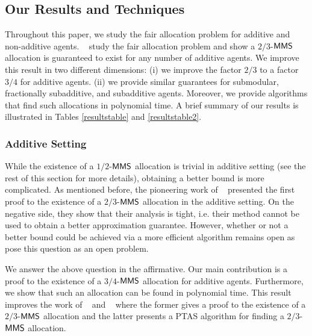 \subsection{Our Results and Techniques}\label{results}
Throughout this paper, we study the fair allocation problem for additive and non-additive agents.
\procacciafirst~\cite{Procaccia:first} study the fair allocation problem and show a $2/3$-$\mathsf{MMS}$ allocation is guaranteed to exist for any number of additive agents. We improve this result in two different dimensions: (i) we improve the factor $2/3$ to a factor $3/4$ for additive agents. (ii) we provide similar guarantees for submodular, fractionally subadditive, and subadditive agents. Moreover, we provide algorithms that find such allocations in polynomial time. A brief summary of our results is illustrated in Tables \ref{resultstable} and \ref{resultstable2}.



\subsubsection{Additive Setting}

While the existence of a $1/2$-$\mathsf{MMS}$ allocation is trivial in additive setting (see the rest of this section for more details), obtaining a better bound is more complicated. As mentioned before, the pioneering work of \procacciafirst ~\cite{Procaccia:first} presented the first proof to the existence of a $2/3$-$\mathsf{MMS}$ allocation in the additive setting. 
On the negative side, they show that their analysis is tight, i.e. %
their method cannot be used to obtain a better approximation guarantee. However, whether or not a better bound could be achieved via a more efficient algorithm remains open as \procacciafirst~\cite{Procaccia:first} pose this question as an open problem.



We answer the above question in the affirmative. Our main contribution is a proof to the existence of a $3/4$-$\mathsf{MMS}$ allocation for additive agents. Furthermore, we show that such an allocation can be found in polynomial time. This result improves the work of \procacciafirst ~\cite{Procaccia:first} and \amanatidisapproximation ~\cite{amanatidis2015approximation} where the former gives a proof to the existence of a $2/3$-$\mathsf{MMS}$ allocation and the latter presents a PTAS algorithm for finding a $2/3$-$\mathsf{MMS}$ allocation.

